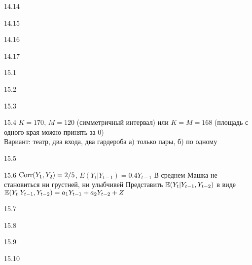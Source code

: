 \protect \hypertarget {soln:14.14}{}
\begin{solution}{{14.14}}
\end{solution}
\protect \hypertarget {soln:14.15}{}
\begin{solution}{{14.15}}
\end{solution}
\protect \hypertarget {soln:14.16}{}
\begin{solution}{{14.16}}
\end{solution}
\protect \hypertarget {soln:14.17}{}
\begin{solution}{{14.17}}
\end{solution}
\protect \hypertarget {soln:15.1}{}
\begin{solution}{{15.1}}
  \autocite{mukherjee2017proof}
\end{solution}
\protect \hypertarget {soln:15.2}{}
\begin{solution}{{15.2}}
\end{solution}
\protect \hypertarget {soln:15.3}{}
\begin{solution}{{15.3}}
\end{solution}
\protect \hypertarget {soln:15.4}{}
\begin{solution}{{15.4}}
  $K=170$, $M=120$ (симметричный интервал) или $K=M=168$ (площадь с одного края можно принять за 0) \\
  Вариант: театр, два входа, два гардероба а) только пары, б) по одному
\end{solution}
\protect \hypertarget {soln:15.5}{}
\begin{solution}{{15.5}}
\end{solution}
\protect \hypertarget {soln:15.6}{}
\begin{solution}{{15.6}}
  $\operatorname{Corr}(Y_1, Y_2) = 2/5$, $E(Y_t | Y_{t-1}) = 0.4 Y_{t-1}$
  В среднем Машка не становиться ни грустней, ни улыбчивей
  Представить $\mathbb{E}(Y_t | Y_{t-1}, Y_{t-2})$ в виде $\mathbb{E}(Y_t | Y_{t-1}, Y_{t-2}) = a_1 Y_{t-1} + a_2 Y_{t-2} + Z$
\end{solution}
\protect \hypertarget {soln:15.7}{}
\begin{solution}{{15.7}}
\end{solution}
\protect \hypertarget {soln:15.8}{}
\begin{solution}{{15.8}}
\end{solution}
\protect \hypertarget {soln:15.9}{}
\begin{solution}{{15.9}}
\end{solution}
\protect \hypertarget {soln:15.10}{}
\begin{solution}{{15.10}}
\end{solution}
